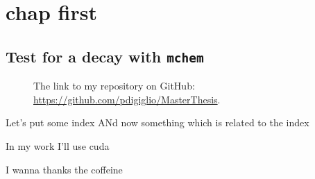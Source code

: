 \documentclass[
	10pt,
	twoside,
	openright,
]{scrbook}
\title{}
\subtitle{}
\author{
  
}
\date{}
\begin{document}
%
\frontmatter
{}
	\maketitle
	\thispagestyle{empty}

	\cleardoublepage
{}
	

	\cleardoublepage
{}
	

	\cleardoublepage
{}
	

	\cleardoublepage
{}
	\tableofcontents

%
\mainmatter
\chapter{chap first}
\lipsum

\section{Test for a decay with \texttt{mchem}}


\begin{figure}
	\centering
\caption{The link to my repository on GitHub: \url{https://github.com/pdigiglio/MasterThesis}.}
\end{figure}


Let's put some index
ANd now something which is related to the index




In my work I'll use \gls{cuda}


I wanna thanks the coffeine
%

%
\backmatter
	\printnoidxglossaries

	\cleardoublepage
	\printindex

	\cleardoublepage
	\nocite{*}
	\printbibliography
\end{document}
